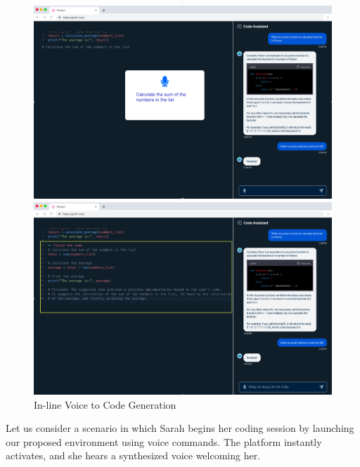 \begin{figure}[t]
\centering
\begin{minipage}{.48\textwidth}
\centering
\includegraphics[width=.98\textwidth]{p4h-3}
\end{minipage}
\begin{minipage}{.48\textwidth}
\centering
\includegraphics[width=.98\textwidth]{p4h-4}
\end{minipage}  
\caption{In-line Voice to Code Generation}
\label{thrust3-two}
\end{figure}

 Let us consider a scenario in which Sarah
begins her coding session by launching our proposed environment using
voice commands. The platform instantly activates, and she hears a
synthesized voice welcoming her.

